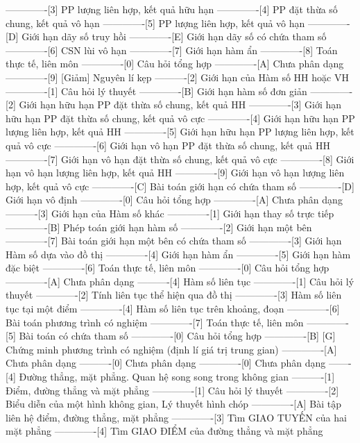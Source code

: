 -------------[3] PP lượng liên hợp, kết quả hữu hạn
-------------[4] PP đặt thừa số chung, kết quả vô hạn
-------------[5] PP lượng liên hợp, kết quả vô hạn
-------------[D] Giới hạn dãy số truy hồi
-------------[E] Giới hạn dãy số có chứa tham số
-------------[6] CSN lùi vô hạn 
-------------[7] Giới hạn hàm ẩn
-------------[8] Toán thực tế, liên môn
-------------[0] Câu hỏi tổng hợp
-------------[A] Chưa phân dạng
-------------[9] [Giảm] Nguyên lí kẹp
----------[2] Giới hạn của Hàm số HH hoặc VH
-------------[1] Câu hỏi lý thuyết
-------------[B] Giới hạn hàm số đơn giản
-------------[2] Giới hạn hữu hạn PP đặt thừa số chung, kết quả HH
-------------[3] Giới hạn hữu hạn PP đặt thừa số chung, kết quả vô cực
-------------[4] Giới hạn hữu hạn PP lượng liên hợp, kết quả HH
-------------[5] Giới hạn hữu hạn PP lượng liên hợp, kết quả vô cực
-------------[6] Giới hạn vô hạn PP đặt thừa số chung, kết quả HH
-------------[7] Giới hạn vô hạn đặt thừa số chung, kết quả vô cực
-------------[8] Giới hạn vô hạn lượng liên hợp, kết quả HH
-------------[9] Giới hạn vô hạn lượng liên hợp, kết quả vô cực
-------------[C] Bài toán giới hạn có chứa tham số
-------------[D] Giới hạn vô định
-------------[0] Câu hỏi tổng hợp
-------------[A] Chưa phân dạng
----------[3] Giới hạn của Hàm số khác
-------------[1] Giới hạn thay số trực tiếp
-------------[B] Phép toán giới hạn hàm số
-------------[2] Giới hạn một bên
-------------[7] Bài toán giới hạn một bên có chứa tham số
-------------[3] Giới hạn Hàm số dựa vào đồ thị
-------------[4] Giới hạn hàm ẩn
-------------[5] Giới hạn hàm đặc biệt
-------------[6] Toán thực tế, liên môn
-------------[0] Câu hỏi tổng hợp
-------------[A] Chưa phân dạng
----------[4] Hàm số liên tục
-------------[1] Câu hỏi lý thuyết
-------------[2] Tính liên tục thể hiện qua đồ thị
-------------[3] Hàm số liên tục tại một điểm
-------------[4] Hàm số liên tục trên khoảng, đoạn
-------------[6] Bài toán phương trình có nghiệm
-------------[7] Toán thực tế, liên môn
-------------[5] Bài toán có chứa tham số
-------------[0] Câu hỏi tổng hợp
-------------[B] [G] Chứng minh phương trình có nghiệm (định lí giá trị trung gian)
-------------[A] Chưa phân dạng
----------[0] Chưa phân dạng
-------------[0] Chưa phân dạng
-------[4] Đường thẳng, mặt phẳng. Quan hệ song song trong không gian
----------[1] Điểm, đường thẳng và mặt phẳng
-------------[1] Câu hỏi lý thuyết
-------------[2] Biểu diễn của một hình không gian, Lý thuyết hình chóp
-------------[A] Bài tập liên hệ điểm, đường thẳng, mặt phẳng
-------------[3] Tìm GIAO TUYẾN của hai mặt phẳng
-------------[4] Tìm GIAO ĐIỂM của đường thẳng và mặt phẳng
